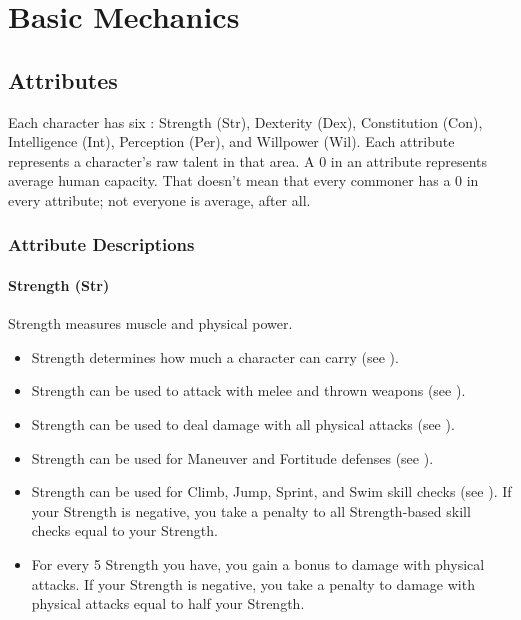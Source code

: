 \chapter{Basic Mechanics}

\section{Attributes}\label{Attributes}
    Each character has six : Strength (Str), Dexterity (Dex), Constitution (Con), Intelligence (Int), Perception (Per), and Willpower (Wil).
    Each attribute represents a character's raw talent in that area.
    A 0 in an attribute represents average human capacity.
    That doesn't mean that every commoner has a 0 in every attribute; not everyone is average, after all.

    \subsection{Attribute Descriptions}

        \subsubsection{Strength (Str)}\label{Strength}
            Strength measures muscle and physical power.
            \begin{itemize}
                \item Strength determines how much a character can carry (see ).
                \item Strength can be used to attack with melee and thrown weapons (see ).
                \item Strength can be used to deal damage with all physical attacks (see ).
                \item Strength can be used for Maneuver and Fortitude defenses (see ).
                \item Strength can be used for Climb, Jump, Sprint, and Swim skill checks (see ). If your Strength is negative, you take a penalty to all Strength-based skill checks equal to your Strength.
                \item For every 5 Strength you have, you gain a  bonus to damage with physical attacks. If your Strength is negative, you take a penalty to damage with physical attacks equal to half your Strength.
            \end{itemize}

